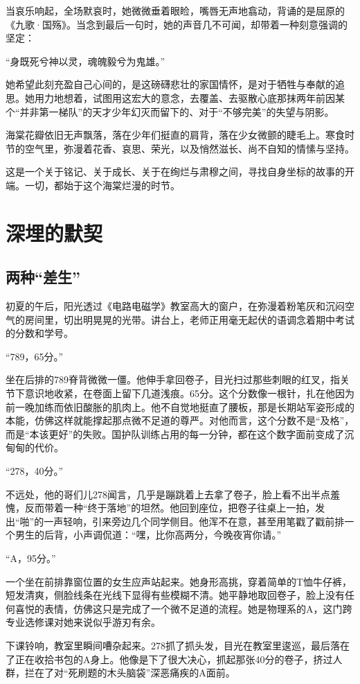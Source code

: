 \documentclass[a4paper]{book}
\begin{document}
当哀乐响起，全场默哀时，她微微垂着眼睑，嘴唇无声地翕动，背诵的是屈原的《九歌·国殇》。当念到最后一句时，她的声音几不可闻，却带着一种刻意强调的坚定：

“身既死兮神以灵，魂魄毅兮为鬼雄。”

她希望此刻充盈自己心间的，是这磅礴悲壮的家国情怀，是对于牺牲与奉献的追思。她用力地想着，试图用这宏大的意念，去覆盖、去驱散心底那抹两年前因某个“并非第一梯队”的天才少年幻灭而留下的、对于“不够完美”的失望与阴影。

海棠花瓣依旧无声飘落，落在少年们挺直的肩背，落在少女微颤的睫毛上。寒食时节的空气里，弥漫着花香、哀思、荣光，以及悄然滋长、尚不自知的情愫与坚持。

这是一个关于铭记、关于成长、关于在绚烂与肃穆之间，寻找自身坐标的故事的开端。一切，都始于这个海棠烂漫的时节。
\newpage
\large
\chapter{深埋的默契}
\normalsize
\section{两种“差生”}
\songti{}
初夏的午后，阳光透过《电路电磁学》教室高大的窗户，在弥漫着粉笔灰和沉闷空气的房间里，切出明晃晃的光带。讲台上，老师正用毫无起伏的语调念着期中考试的分数和学号。

“789，65分。”

坐在后排的789脊背微微一僵。他伸手拿回卷子，目光扫过那些刺眼的红叉，指关节下意识地收紧，在卷面上留下几道浅痕。65分。这个分数像一根针，扎在他因为前一晚加练而依旧酸胀的肌肉上。他不自觉地挺直了腰板，那是长期站军姿形成的本能，仿佛这样就能撑起那点微不足道的尊严。对他而言，这个分数不是“及格”，而是“本该更好”的失败。国护队训练占用的每一分钟，都在这个数字面前变成了沉甸甸的代价。

“278，40分。”

不远处，他的哥们儿278闻言，几乎是蹦跳着上去拿了卷子，脸上看不出半点羞愧，反而带着一种“终于落地”的坦然。他回到座位，把卷子往桌上一拍，发出“啪”的一声轻响，引来旁边几个同学侧目。他浑不在意，甚至用笔戳了戳前排一个男生的后背，小声调侃道：“嘿，比你高两分，今晚夜宵你请。”

“A，95分。”

一个坐在前排靠窗位置的女生应声站起来。她身形高挑，穿着简单的T恤牛仔裤，短发清爽，侧脸线条在光线下显得有些模糊不清。她平静地取回卷子，脸上没有任何喜悦的表情，仿佛这只是完成了一个微不足道的流程。她是物理系的A，这门跨专业选修课对她来说似乎游刃有余。

下课铃响，教室里瞬间嘈杂起来。278抓了抓头发，目光在教室里逡巡，最后落在了正在收拾书包的A身上。他像是下了很大决心，抓起那张40分的卷子，挤过人群，拦在了对“死刷题的木头脑袋”深恶痛疾的A面前。
\end{document}
